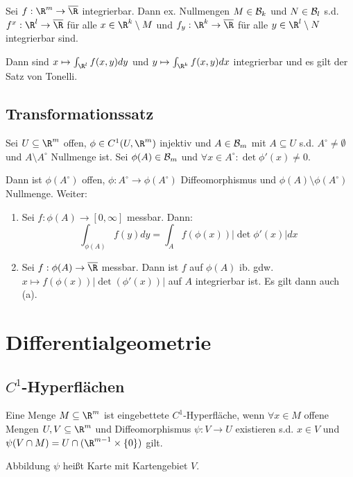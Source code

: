 Sei $f : \R^m \to \overline\R$ integrierbar. Dann ex. Nullmengen $M \in \mathcal{B}_k$ und $N \in \mathcal{B}_l$ s.d. $f^x : \R^l \to \overline\R$ für alle $x \in \R^k \setminus M$ und $f_y : \R^k \to \overline\R$ für alle $y \in \R^l \setminus N$ integrierbar sind.

Dann sind $x \mapsto \int_{\R^l} f(x,y) dy$ und $y \mapsto \int_{\R^k} f(x,y) dx$ integrierbar und es gilt der Satz von Tonelli.

\subsection*{Transformationssatz}

Sei $U \subseteq \R^m$ offen, $\phi \in C^1(U,\R^m)$ injektiv und $A \in \mathcal{B}_m$ mit $A \subseteq U$ s.d. $A^\circ \neq \emptyset$ und $A \setminus A^\circ$ Nullmenge ist. Sei $\phi(A) \in \mathcal{B}_m$ und $\forall x \in A^\circ : \det \phi'(x) \neq 0$.

Dann ist $\phi(A^\circ)$ offen, $\phi : A^\circ \to \phi(A^\circ)$ Diffeomorphismus und $\phi(A) \setminus \phi(A^\circ)$ Nullmenge. Weiter:

\begin{enumerate}[label=(\alph*)]
	\item Sei $f: \phi(A) \to [0,\infty]$ messbar. Dann: \vspace{-2mm}  \[ \int_{\phi(A)} f(y) dy = \int_A f(\phi(x))|\det \phi'(x)| dx \]
	\item Sei $f : \phi(A) \to \overline\R$ messbar. Dann ist $f$ auf $\phi(A)$ ib. gdw. $x \mapsto f(\phi(x))|\det(\phi'(x))|$ auf $A$ integrierbar ist. Es gilt dann auch (a).
\end{enumerate}

\section*{Differentialgeometrie}

\subsection*{$C^1$-Hyperflächen}

Eine Menge $M \subseteq \R^m$ ist eingebettete $C^1$-Hyperfläche, wenn $\forall x \in M$ offene Mengen $U, V \subseteq \R^m$ und Diffeomorphismus $\psi : V \to U$ existieren s.d. $x \in V$ und $\psi(V \cap M) = U \cap (\R^{m-1} \times \{0\})$ gilt.

\spacing

Abbildung $\psi$ heißt Karte mit Kartengebiet $V$.

